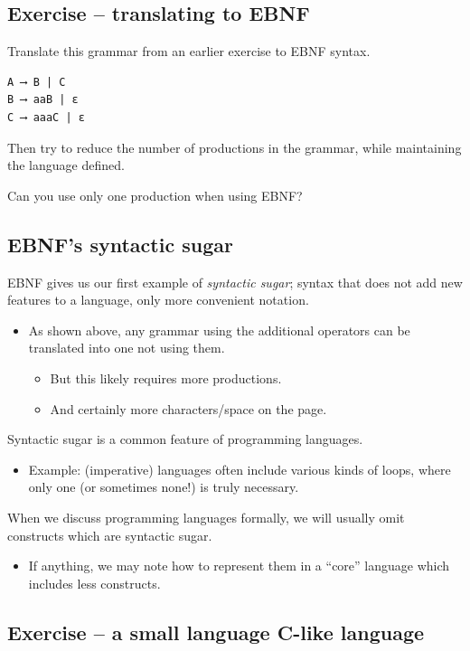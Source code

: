 \documentclass[11pt]{article}
\theoremstyle{definition}
\begin{document}
\subsection{Exercise – translating to EBNF}
\label{sec:org97508c9}

Translate this grammar from an earlier exercise to EBNF syntax.
\begin{verbatim}
A ⟶ B | C
B ⟶ aaB | ε
C ⟶ aaaC | ε
\end{verbatim}
Then try to reduce the number of productions in the grammar,
while maintaining the language defined.

Can you use only one production when using EBNF?

\subsection{EBNF's syntactic sugar}
\label{sec:orgf6b46c4}

EBNF gives us our first example of \emph{syntactic sugar};
syntax that does not add new features to a language,
only more convenient notation.
\begin{itemize}
\item As shown above, any grammar using the additional operators
can be translated into one not using them.
\begin{itemize}
\item But this likely requires more productions.
\item And certainly more characters/space on the page.
\end{itemize}
\end{itemize}

Syntactic sugar is a common feature of programming languages.
\begin{itemize}
\item Example: (imperative) languages often include various kinds of loops,
where only one (or sometimes none!) is truly necessary.
\end{itemize}

When we discuss programming languages formally,
we will usually omit constructs which are syntactic sugar.
\begin{itemize}
\item If anything, we may note how to represent them
in a “core” language which includes less constructs.
\end{itemize}

\subsection{Exercise – a small language C-like language}
\label{sec:orgd6444d5}
\end{document}

